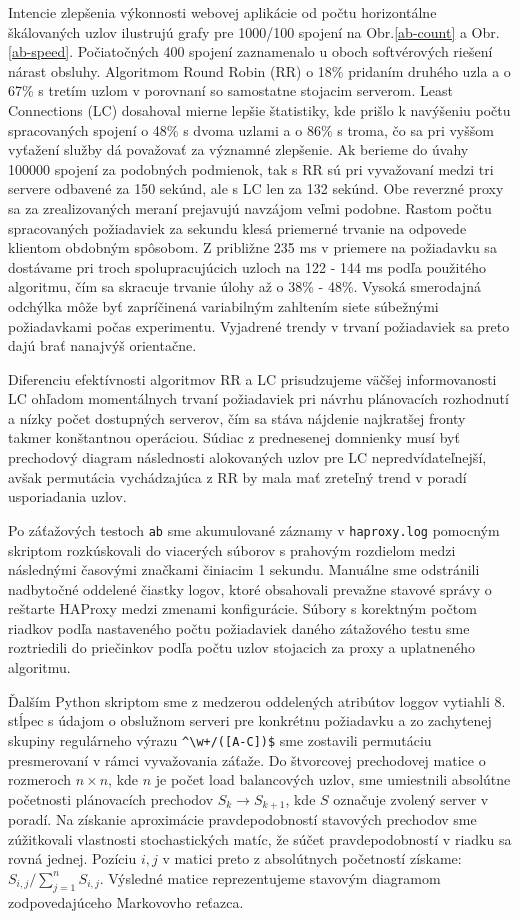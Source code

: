 \documentclass[12pt, a4paper]{article}
\begin{document}
Intencie zlepšenia výkonnosti webovej aplikácie od počtu horizontálne škálovaných uzlov ilustrujú
grafy pre 1000/100 spojení na Obr.\ref{ab-count} a Obr.\ref{ab-speed}. Počiatočných 400 spojení 
zaznamenalo u oboch softvérových riešení nárast obsluhy. Algoritmom Round Robin (RR) o 18\% pridaním 
druhého uzla a o 67\% s tretím uzlom v porovnaní so samostatne stojacim serverom. Least Connections (LC)
dosahoval mierne lepšie štatistiky, kde prišlo k navýšeniu počtu spracovaných spojení o 48\% 
s dvoma uzlami a o 86\% s troma, čo sa pri vyššom vyťažení služby dá považovať za významné zlepšenie.
Ak berieme do úvahy 100000 spojení za podobných podmienok, tak s RR sú pri vyvažovaní medzi tri servere
odbavené za 150 sekúnd, ale s LC len za 132 sekúnd. Obe reverzné proxy sa za zrealizovaných meraní prejavujú 
navzájom veľmi podobne. Rastom počtu spracovaných požiadaviek za sekundu klesá priemerné trvanie na odpovede 
klientom obdobným spôsobom. Z približne 235 ms v priemere na požiadavku sa dostávame pri troch 
spolupracujúcich uzloch na 122 - 144 ms podľa použitého algoritmu, čím sa skracuje trvanie úlohy až o
38\% - 48\%. Vysoká smerodajná odchýlka môže byť zapríčinená variabilným zahltením siete súbežnými 
požiadavkami počas experimentu. Vyjadrené trendy v trvaní požiadaviek sa preto dajú brať nanajvýš orientačne.

Diferenciu efektívnosti algoritmov RR a LC prisudzujeme väčšej informovanosti LC ohľadom
momentálnych trvaní požiadaviek pri návrhu plánovacích rozhodnutí a nízky počet dostupných serverov, 
čím sa stáva nájdenie najkratšej fronty takmer konštantnou operáciou. Súdiac z prednesenej
domnienky musí byť prechodový diagram následnosti alokovaných uzlov pre LC nepredvídateľnejší, 
avšak permutácia vychádzajúca z RR by mala mať zreteľný trend v poradí usporiadania uzlov.

Po záťažových testoch \verb|ab| sme akumulované záznamy v \verb|haproxy.log| pomocným skriptom
rozkúskovali do viacerých súborov s prahovým rozdielom medzi následnými časovými značkami činiacim
1 sekundu. Manuálne sme odstránili nadbytočné oddelené čiastky logov, ktoré obsahovali prevažne
stavové správy o reštarte HAProxy medzi zmenami konfigurácie. Súbory s korektným počtom riadkov
podľa nastaveného počtu požiadaviek daného zátažového testu sme roztriedili do priečinkov podľa
počtu uzlov stojacich za proxy a uplatneného algoritmu.

Ďalším Python skriptom sme z medzerou oddelených atribútov loggov vytiahli 8. stĺpec s údajom o obslužnom 
serveri pre konkrétnu požiadavku a zo zachytenej skupiny regulárneho výrazu \verb|^\w+/([A-C])$| sme 
zostavili permutáciu presmerovaní v rámci vyvažovania záťaže. Do štvorcovej prechodovej matice o rozmeroch $n 
\times n$, kde $n$ je počet load balancových uzlov, sme umiestnili absolútne početnosti plánovacích prechodov 
$S_k\rightarrow S_{k+1}$, kde $S$ označuje zvolený server v poradí. Na získanie aproximácie pravdepodobností
stavových prechodov sme zúžitkovali vlastnosti stochastických matíc, že súčet pravdepodobností v riadku sa 
rovná jednej. Pozíciu $i,j$ v matici preto z absolútnych početností získame: 
$S_{i,j} / \sum_{j=1}^{n}{S_{i,j}}$. Výsledné matice reprezentujeme stavovým diagramom zodpovedajúceho
Markovovho reťazca.
\end{document}
